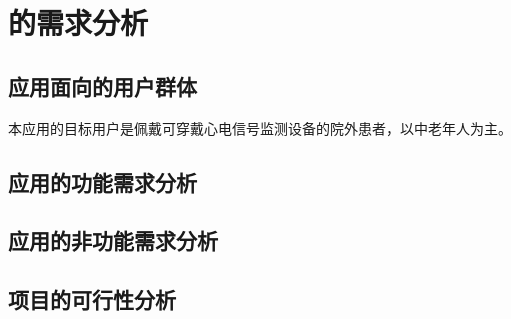 \chapter{\app 的需求分析}\label{ch:req}


\section{应用面向的用户群体}\label{sec:target-user}

本应用的目标用户是佩戴可穿戴心电信号监测设备的院外患者，以中老年人为主。


\section{应用的功能需求分析}\label{sec:func-req}



\section{应用的非功能需求分析}\label{sec:nonfunc-req}



\section{项目的可行性分析}\label{sec:feasibility}

